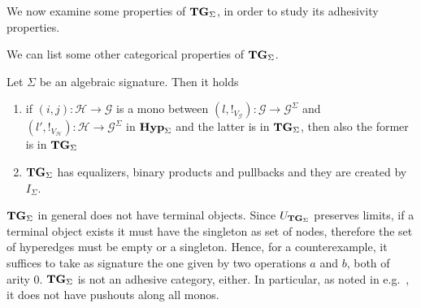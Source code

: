 \documentclass[a4paper,UKenglish,cleveref,pdftex,thm-restate,numberwithinsect]{lipics-v2021}
\newcommand{\Set}{\mathbf{Set}}
\newcommand{\catname}[1]{\textbf{\textup{#1}}}
\newcommand{\hyp}{\catname{Hyp}}
\newcommand{\tg}[0]{\catname{TG}_{\Sigma}}
\newcommand{\commentato}[1]{ {} }
\begin{document}



We now examine some properties of $\tg$, in order to study its adhesivity properties.

\commentato{
\begin{proof}
	This follows noticing that $\Delta_{\Sigma}(X)$ is a term graph for every object $X$.
\end{proof}}

We can list some other categorical properties of $\tg$.


\begin{proposition}
Let $\Sigma$ be an algebraic signature. Then it holds
\begin{enumerate}
	\item if  $(i,j)\colon \mathcal{H}\to \mathcal{G}$ is a mono between  $(l, !_{V_\mathcal{G}})\colon \mathcal{G}\to \mathcal{G}^{\Sigma}$ and $(l', !_{V_\mathcal{H}})\colon \mathcal{H}\to \mathcal{G}^{\Sigma}$ in $\hyp_\Sigma$ and the latter is in $\tg$, then also the former is in $\tg$
	\item $\tg$ has equalizers, binary products and pullbacks and they are created by $I_\Sigma$.
\end{enumerate}
\end{proposition}

\begin{remark}
	$\tg$ in general does not have terminal objects. 
	Since $U_{\tg}$ preserves limits, if a terminal object exists it must have the singleton as set of nodes, therefore the set of hyperedges must be empty or a singleton. 
	Hence, for a counterexample, it suffices to take as signature the one given by two operations $a$ and $b$, both of arity $0$.
	$\tg$ is not an adhesive category, either. 
	In particular, as noted in e.g.~\cite{CastelnovoGM24}, 
	 it does not have pushouts along all monos. 
\end{remark}
	
\end{document}

